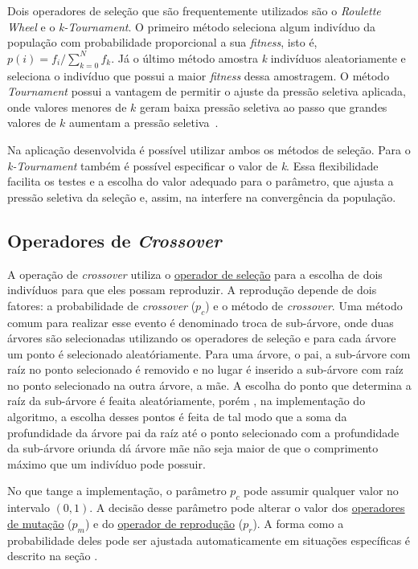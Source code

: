 \documentclass[a4paper]{article}
\begin{document}
Dois operadores de seleção que são frequentemente utilizados são o
\textit{Roulette Wheel} e o \textit{k-Tournament}. O primeiro método seleciona
algum indivíduo da população com probabilidade proporcional a sua
\textit{fitness}, isto é, $p(i)=f_i/\sum_{k=0}^{N}f_k$. Já o último método
amostra \textit{k} indivíduos aleatoriamente e seleciona o indivíduo que possui
a maior \textit{fitness} dessa amostragem. O método \textit{Tournament} possui
a vantagem de permitir o ajuste da pressão seletiva aplicada, onde valores
menores de $k$ geram baixa pressão seletiva ao passo que grandes valores de $k$
aumentam a pressão seletiva~\citep{Baeck1994}.

Na aplicação desenvolvida é possível utilizar ambos os métodos de seleção. Para
o \textit{k-Tournament} também é possível especificar o valor de \textit{k}.
Essa flexibilidade facilita os testes e a escolha do valor adequado para o
parâmetro, que ajusta a pressão seletiva da seleção e, assim, na interfere na
convergência da população.

\subsection{Operadores de \textit{Crossover}} \label{subsec:crossover}

A operação de \textit{crossover} utiliza o \hyperref[subsec:selection]{operador
  de seleção} para a escolha de dois indivíduos para que eles possam
reproduzir. A reprodução depende de dois fatores: a probabilidade de
\textit{crossover} ($p_c$) e o método de \textit{crossover}.  Uma método comum
para realizar esse evento é denominado troca de sub-árvore, onde duas árvores
são selecionadas utilizando os operadores de seleção e para cada árvore um ponto
é selecionado aleatóriamente. Para uma árvore, o pai, a sub-árvore com raíz no
ponto selecionado é removido e no lugar é inserido a sub-árvore com raíz no
ponto selecionado na outra árvore, a mãe. A escolha do ponto que determina a
raíz da sub-árvore é feaita aleatóriamente, porém , na implementação do
algoritmo, a escolha desses pontos é feita de tal modo que a soma da
profundidade da árvore pai da raíz até o ponto selecionado com a profundidade da
sub-árvore oriunda dá árvore mãe não seja maior de que o comprimento máximo que
um indivíduo pode possuir.

No que tange a implementação, o parâmetro $p_c$ pode assumir qualquer valor no
intervalo $(0, 1)$. A decisão desse parâmetro pode alterar o valor dos
\hyperref[subsec:mutation]{operadores de mutação} ($p_m$) e do
\hyperref[subsec:reproduction]{operador de reprodução} ($p_r$). A forma como a
probabilidade deles pode ser ajustada automaticamente em situações específicas é
descrito na seção .
\end{document}
